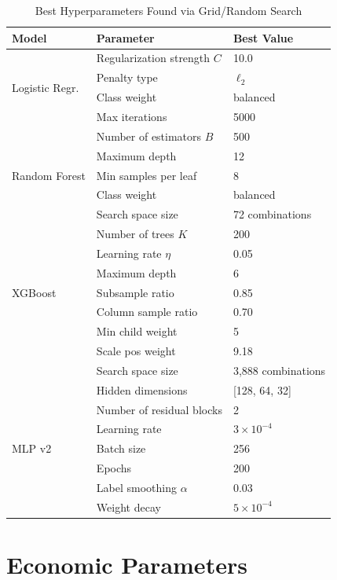 \documentclass[12pt, a4paper]{article}
\begin{document}
\begin{table}[H]
\centering
\caption{Best Hyperparameters Found via Grid/Random Search}
\label{tab:hparams}
\small
\renewcommand{\arraystretch}{1.15}
\begin{tabular}{@{}lll@{}}
\toprule
\textbf{Model} & \textbf{Parameter} & \textbf{Best Value}\\
\midrule
\multirow{4}{*}{Logistic Regr.} 
& Regularization strength $C$ & 10.0\\
& Penalty type & $\ell_2$\\
& Class weight & balanced\\
& Max iterations & 5000\\
\midrule
\multirow{5}{*}{Random Forest}
& Number of estimators $B$ & 500\\
& Maximum depth & 12\\
& Min samples per leaf & 8\\
& Class weight & balanced\\
& Search space size & 72 combinations\\
\midrule
\multirow{7}{*}{XGBoost}
& Number of trees $K$ & 200\\
& Learning rate $\eta$ & 0.05\\
& Maximum depth & 6\\
& Subsample ratio & 0.85\\
& Column sample ratio & 0.70\\
& Min child weight & 5\\
& Scale pos weight & 9.18\\
& Search space size & 3{,}888 combinations\\
\midrule
\multirow{7}{*}{MLP v2}
& Hidden dimensions & [128, 64, 32]\\
& Number of residual blocks & 2\\
& Learning rate & $3 \times 10^{-4}$\\
& Batch size & 256\\
& Epochs & 200\\
& Label smoothing $\alpha$ & 0.03\\
& Weight decay & $5 \times 10^{-4}$\\
\bottomrule
\end{tabular}
\end{table}


\section{Economic Parameters}\label{app:econ_params}
\end{document}
